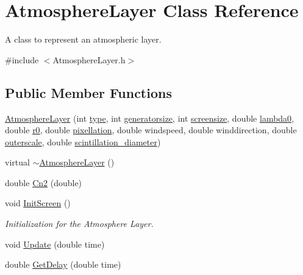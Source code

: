 \hypertarget{classAtmosphereLayer}{
\section{AtmosphereLayer Class Reference}
\label{classAtmosphereLayer}
}


A class to represent an atmospheric layer.  




{\ttfamily \#include $<$AtmosphereLayer.h$>$}

\subsection*{Public Member Functions}
\begin{DoxyCompactItemize}
\item 
\hyperlink{classAtmosphereLayer_a3c8790e634718a469133a50ec876bafe}{AtmosphereLayer} (int \hyperlink{classAtmosphereLayer_a18a224d4bfa76d79230990279fdccb70}{type}, int \hyperlink{classAtmosphereLayer_af7a8b5a4fb4998b3ed4ad564faa78280}{generatorsize}, int \hyperlink{classAtmosphereLayer_adf9ae351a2a60df00cbbd3bd68d2fc02}{screensize}, double \hyperlink{classAtmosphereLayer_ad06e6f68425560b65b47713c5d871bc8}{lambda0}, double \hyperlink{classAtmosphereLayer_a21fe11753b8673dfec2f8909a230635d}{r0}, double \hyperlink{classAtmosphereLayer_a46e0ed39d72c3caddb436d1259d490fb}{pixellation}, double windspeed, double winddirection, double \hyperlink{classAtmosphereLayer_ac9e60f4a28316e69c292e2e0af10e476}{outerscale}, double \hyperlink{classAtmosphereLayer_aa82dd3a608dae480bd90ade6262f6615}{scintillation\_\-diameter})
\item 
virtual \hyperlink{classAtmosphereLayer_a871fc905e613df4efdffc2f631cab302}{$\sim$AtmosphereLayer} ()
\item 
double \hyperlink{classAtmosphereLayer_a1359f46796c622d7e42d41958975a064}{Cn2} (double)
\item 
void \hyperlink{classAtmosphereLayer_ac74b582d0e4cbf31979eedebf5832c35}{InitScreen} ()
\begin{DoxyCompactList}\small\item\em Initialization for the Atmosphere Layer. \item\end{DoxyCompactList}\item 
void \hyperlink{classAtmosphereLayer_a8ad3f0ff42e11f22d3b1585958f606fc}{Update} (double time)
\item 
double \hyperlink{classAtmosphereLayer_ab0728692549bca3836385bf561974890}{GetDelay} (double time)
\end{DoxyCompactItemize}
